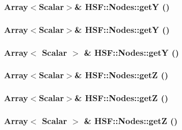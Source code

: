 \label{classHSF_1_1Nodes_a760ecb9be7c2a92d622bfce425201784}
\hypertarget{classHSF_1_1Nodes_a4812ccaf862af8b114903ca9adf68ded}{
\subsubsection[{getY}]{\setlength{\rightskip}{0pt plus 5cm}Array$<${\bf Scalar}$>$\& HSF::Nodes::getY ()}}
\label{classHSF_1_1Nodes_a4812ccaf862af8b114903ca9adf68ded}
\hypertarget{classHSF_1_1Nodes_a4812ccaf862af8b114903ca9adf68ded}{
\subsubsection[{getY}]{\setlength{\rightskip}{0pt plus 5cm}Array$<${\bf Scalar}$>$\& HSF::Nodes::getY ()}}
\label{classHSF_1_1Nodes_a4812ccaf862af8b114903ca9adf68ded}
\hypertarget{classHSF_1_1Nodes_aec349ea7122ee1da0a60185e804adf1f}{
\subsubsection[{getY}]{\setlength{\rightskip}{0pt plus 5cm}Array$<$ {\bf Scalar} $>$ \& HSF::Nodes::getY ()}}
\label{classHSF_1_1Nodes_aec349ea7122ee1da0a60185e804adf1f}
\hypertarget{classHSF_1_1Nodes_a2de318fe71131d231c84a79bc228f35b}{
\subsubsection[{getZ}]{\setlength{\rightskip}{0pt plus 5cm}Array$<${\bf Scalar}$>$\& HSF::Nodes::getZ ()}}
\label{classHSF_1_1Nodes_a2de318fe71131d231c84a79bc228f35b}
\hypertarget{classHSF_1_1Nodes_a2de318fe71131d231c84a79bc228f35b}{
\subsubsection[{getZ}]{\setlength{\rightskip}{0pt plus 5cm}Array$<${\bf Scalar}$>$\& HSF::Nodes::getZ ()}}
\label{classHSF_1_1Nodes_a2de318fe71131d231c84a79bc228f35b}
\hypertarget{classHSF_1_1Nodes_a09fe0de278bdddea1c21634e7ade9fed}{
\subsubsection[{getZ}]{\setlength{\rightskip}{0pt plus 5cm}Array$<$ {\bf Scalar} $>$ \& HSF::Nodes::getZ ()}}
